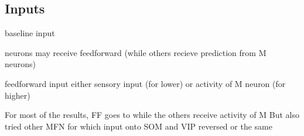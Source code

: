 \documentclass[10pt,a4paper,draft]{article}
\begin{document}
%
%

\subsection*{Inputs}
%
baseline input

neurons may receive feedforward (while others recieve prediction from M neurons)

feedforward input either sensory input (for lower) or activity of M neuron (for higher)

For most of the results, FF goes to while the others receive activity of M
But also tried other MFN for which input onto SOM and VIP reversed or the same
\end{document}
